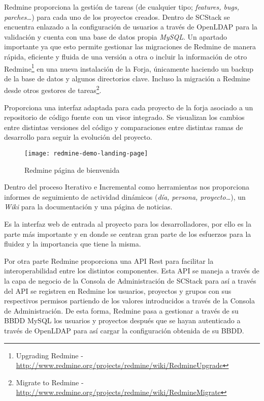 \par Redmine proporciona la gestión de tareas (de cualquier tipo; \emph{features, bugs, parches\ldots}) para cada uno de los proyectos creados. Dentro de SCStack se encuentra enlazado a la configuración de usuarios a través de OpenLDAP para la validación y cuenta con una base de datos propia \emph{MySQL}. Un apartado importante ya que esto permite gestionar las migraciones de Redmine de manera rápida, eficiente y fluida de una versión a otra o incluir la información de otro Redmine\footnote{Upgrading Redmine - \url{http://www.redmine.org/projects/redmine/wiki/RedmineUpgrade}} en una nueva instalación de la Forja, únicamente haciendo un backup de la base de datos y algunos directorios clave. Incluso la migración a Redmine desde otros gestores de tareas\footnote{Migrate to Redmine - \url{http://www.redmine.org/projects/redmine/wiki/RedmineMigrate}}.

\par Proporciona una interfaz adaptada para cada proyecto de la forja asociado a un repositorio de código fuente con un visor integrado. Se visualizan los cambios entre distintas versiones del código y comparaciones entre distintas ramas de desarrollo para seguir la evolución del proyecto.

\begin{figure}[H]
    \centering
    \texttt{[image: redmine-demo-landing-page]}
    \caption{Redmine página de bienvenida}
    \label{fig:redmine-demo-landing-page}
\end{figure}

\par Dentro del proceso Iterativo e Incremental como herramientas nos proporciona informes de seguimiento de actividad dinámicos (\emph{día, persona, proyecto\ldots}), un \emph{Wiki} para la documentación y una página de noticias.

\par Es la interfaz web de entrada al proyecto para los desarrolladores, por ello es la parte más importante y en donde se centran gran parte de los esfuerzos para la fluidez y la importancia que tiene la misma.

\par Por otra parte Redmine proporciona una API Rest para facilitar la interoperabilidad entre los distintos componentes. Esta API se maneja a través de la capa de negocio de la Consola de Administración de SCStack para así a través del API se registren en Redmine los usuarios, proyectos y grupos con sus respectivos permisos partiendo de los valores introducidos a través de la Consola de Administración. De esta forma, Redmine pasa a gestionar a través de su BBDD MySQL los usuarios y proyectos después que se hayan autenticado a través de OpenLDAP para así cargar la configuración obtenida de su BBDD.

